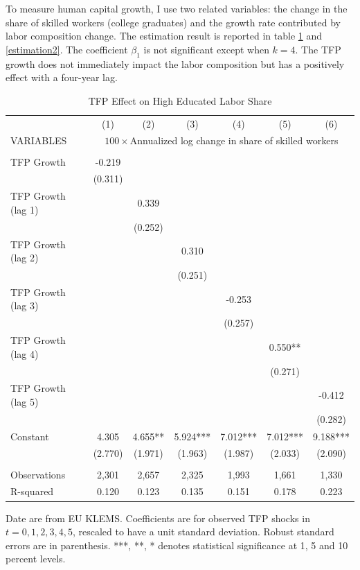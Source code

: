 \documentclass[12pt]{article}
\begin{document}
To measure human capital growth, I use two related variables: the change in the share of skilled workers (college graduates) and the growth rate contributed by labor composition change. The estimation result is reported in table \ref{estimation1} and \ref{estimation2}. The coefficient $\beta_{1}$ is not significant except when $k=4$. The TFP growth does not immediately impact the labor composition but has a positively effect with a four-year lag. 

\begin{table}[h!]
\begin{center}
\scriptsize
\begin{tabular}{lcccccc} \hline \hline
 & (1) & (2) & (3) & (4) & (5) & (6)\\
VARIABLES & \multicolumn{6}{c}{$100 \times$Annualized log change in share of skilled workers} \\ \hline
 &  &  &  &  &  &  \\
TFP Growth & -0.219 &  &  &  &  &  \\
 & (0.311) &  &  &  &  &  \\
TFP Growth (lag 1) &  & 0.339 &  &  &  &  \\
 &  & (0.252) &  &  &  &  \\
TFP Growth (lag 2) &  &  & 0.310 &  &  &  \\
 &  &  & (0.251) &  &  &  \\
TFP Growth (lag 3) &  &  &  & -0.253 &  &  \\
 &  &  &  & (0.257) &  &  \\
TFP Growth (lag 4) &  &  &  &  & 0.550** &  \\
 &  &  &  &  & (0.271) &  \\
TFP Growth (lag 5) &  &  &  &  &  & -0.412 \\
 &  &  &  &  &  & (0.282) \\
Constant & 4.305 & 4.655** & 5.924*** & 7.012*** & 7.012*** & 9.188*** \\
 & (2.770) & (1.971) & (1.963) & (1.987) & (2.033) & (2.090) \\
 &  &  &  &  &  &  \\
Observations & 2,301 & 2,657 & 2,325 & 1,993 & 1,661 & 1,330 \\
 R-squared & 0.120 & 0.123 & 0.135 & 0.151 & 0.178 & 0.223 \\ \hline
\end{tabular}
\end{center}
\caption{TFP Effect on High Educated Labor Share}
\label{estimation1}
{\scriptsize Date are from EU KLEMS. Coefficients are for observed TFP shocks in $t = 0,1,2,3,4,5$, rescaled to have a unit standard deviation. Robust standard errors are in parenthesis. ***, **, * denotes statistical significance at 1, 5 and 10 percent levels.}
\end{table}
\end{document}
